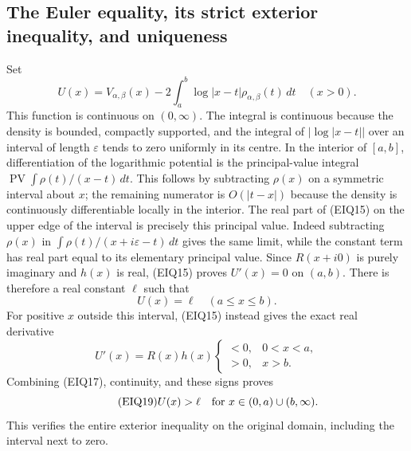 \subsection{The Euler equality, its strict exterior inequality, and uniqueness}
Set
\begin{equation}\tag{EIQ16}
 U(x)=V_{\alpha,\beta}(x)
             -2\int_a^b\log|x-t|\rho_{\alpha,\beta}(t)\,dt
 \quad(x>0).
\end{equation}
This function is continuous on $(0,\infty)$.  The integral is continuous
because the density is bounded, compactly supported, and the integral
of $|\log|x-t||$ over an interval of length $\varepsilon$ tends to zero
uniformly in its centre.  In the interior of $[a,b]$, differentiation of
the logarithmic potential is the principal-value integral
$\operatorname{PV}\int\rho(t)/(x-t)\,dt$.
This follows by subtracting $\rho(x)$ on a symmetric interval about
$x$; the remaining numerator is $O(|t-x|)$ because the density is
continuously differentiable locally in the interior.  The real part of
(EIQ15) on the upper edge of the interval is precisely this principal
value.  Indeed subtracting $\rho(x)$ in
$\int\rho(t)/(x+i\varepsilon-t)\,dt$ gives the same limit, while the
constant term has real part equal to its elementary principal value.
Since $R(x+i0)$ is purely imaginary and $h(x)$ is real, (EIQ15) proves
$U'(x)=0$ on $(a,b)$.  There is therefore a real constant $\ell$ such that
\begin{equation}\tag{EIQ17}
 U(x)=\ell\quad(a\leq x\leq b).
\end{equation}
For positive $x$ outside this interval, (EIQ15) instead gives the exact
real derivative
\begin{equation}\tag{EIQ18}
 U'(x)=R(x)h(x)
 \begin{cases}<0,&0<x<a,\\>0,&x>b.\end{cases}
\end{equation}
Combining (EIQ17), continuity, and these signs proves
\begin{equation}\tag{EIQ19}
 U(x)>\ell\quad\hbox{for }x\in(0,a)\cup(b,\infty).
\end{equation}
This verifies the entire exterior inequality on the original domain,
including the interval next to zero.

